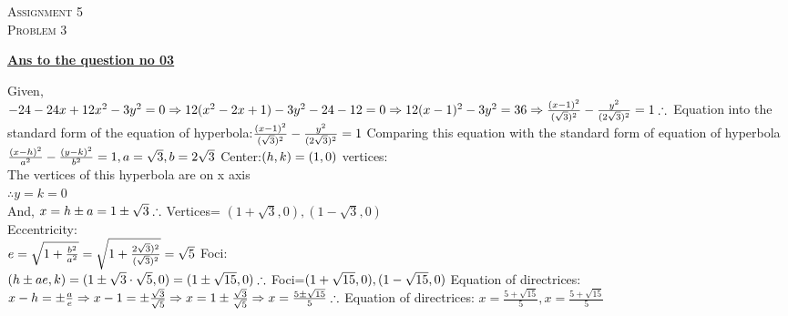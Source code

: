 \documentclass{article}
\begin{document}
\begin{newpage}
    \begin{flushright}
    \textsc{Assignment 5}\\
    \textsc{Problem 3}\\
    [1 cm]
    \end{flushright}
\begin{center}
  \textbf{\Large \underline {Ans to the question no 03}}\\
  [0.5 cm]
\end{center}
\Large {Given, \\[3mm]
$-24-24x+12x^2-3y^2=0\\[3mm]
\Rightarrow 12(x^2-2x+1)-3y^2-24-12=0 \\[3mm]
\Rightarrow 12(x-1)^2-3y^2=36 \\[3mm]
\Rightarrow \frac{(x-1)^2}{(\sqrt{3})^2}-\frac{y^2}{(2\sqrt{3})^2}=1 \\[3mm]
\therefore$ Equation into the standard form of the equation of  hyperbola:$\frac{(x-1)^2}{(\sqrt{3})^2}-\frac{y^2}{(2\sqrt{3})^2}=1\\[3mm]$
Comparing this equation with the standard form of equation of hyperbola $\frac{(x-h)^2}{a^2}- \frac{(y-k)^2}{b^2}=1,\\[3mm]
a=\sqrt{3},b=2\sqrt{3}\\[3mm]$
Center:$(h,k)=(1,0)\\[3mm]$ 
vertices:\\[3mm]
The vertices of this hyperbola  are on x axis\\[3mm]
$\therefore y=k=0$\\[3mm]
And, $x=h\pm a=1 \pm \sqrt{3}\\[3mm]
\therefore  $ Vertices= $(1+\sqrt{3},0),(1-\sqrt{3},0)$\\[3cm]
Eccentricity:\\[3mm]
$e=\sqrt{1 + \frac{b^2}{a^2} }\\[3mm]
=\sqrt{1+\frac{2\sqrt{3})^2}{(\sqrt{3})^2}}\\[3mm]
=\sqrt{5}\\[3mm]$
Foci:\\[3mm]
$(h \pm ae,k)=(1 \pm \sqrt{3} \cdot \sqrt{5},0)=(1 \pm \sqrt{15} ,0)\\[3mm]
\therefore $ Foci=$(1+\sqrt{15} ,0),(1-\sqrt{15} ,0) \\[3mm]$
Equation of directrices:\\[3mm]
$x-h=\pm \frac{a}{e}\\[3mm]
\Rightarrow x-1=\pm \frac{\sqrt{3}}{\sqrt{5}}\\[3mm]
\Rightarrow x=1 \pm \frac{\sqrt{3}}{\sqrt{5}}\\[3mm]
\Rightarrow x=\frac{5\pm \sqrt{15}}{5}\\[3mm]
\therefore$ Equation of directrices:  $ x=\frac{5 + \sqrt{15}}{5},x=\frac{5 + \sqrt{15}}{5}$\\[3mm]}
\end{newpage}
\end{document}
